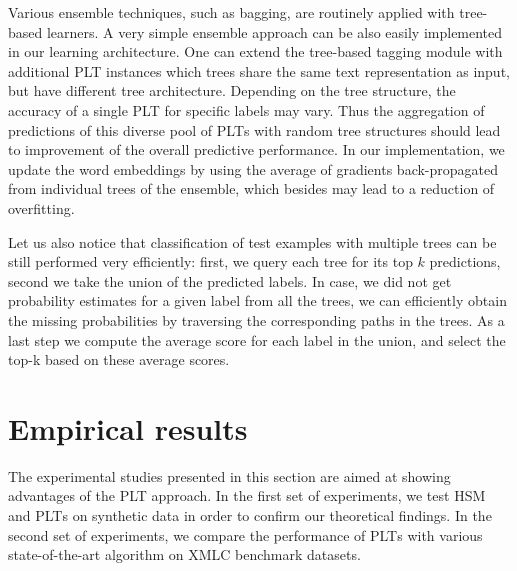 \documentclass{article}
\newcommand{\Algo}[1]{\textsc{#1}}
\newcommand{\sectionBefore}{-0pt}
\newcommand{\sectionAfter}{-0pt}
\begin{document}
{Various ensemble techniques, such as bagging, are routinely applied with tree-based learners. A very simple ensemble approach can be also easily implemented in our learning architecture. One can extend the tree-based tagging module with additional \Algo{PLT} instances which trees share the same text representation as input, but have different tree architecture. Depending on the tree structure, the accuracy of a single \Algo{PLT} for specific labels may vary. Thus the aggregation of predictions of this diverse pool of \Algo{PLT}s with random tree structures should lead to improvement of the overall predictive performance. 
%
In our implementation, we update the word embeddings by using %
the average of gradients back-propagated from individual trees of the ensemble, which besides may lead to a reduction of overfitting.

Let us also notice that classification of test examples with multiple trees can be still performed very efficiently: first, we query each tree for its top $k$ predictions, second we take the union of the predicted labels. In case, we did not get probability estimates for a given label from all the trees, we can efficiently obtain the missing probabilities by traversing the corresponding paths in the trees. As a last step we compute the average score for each label in the union, and select the top-k based on these average scores.



\vspace{\sectionBefore}
\section{Empirical results}
\label{sec:empirical_results}
\vspace{\sectionAfter}

The experimental studies presented in this section are aimed at showing advantages of the \Algo{PLT} approach. In the first set of experiments, we test \Algo{HSM} and \Algo{PLT}s on synthetic data in order to confirm our theoretical findings. In the second set of experiments, we compare the performance of \Algo{PLT}s with various state-of-the-art algorithm on XMLC benchmark datasets.

}
\end{document}
